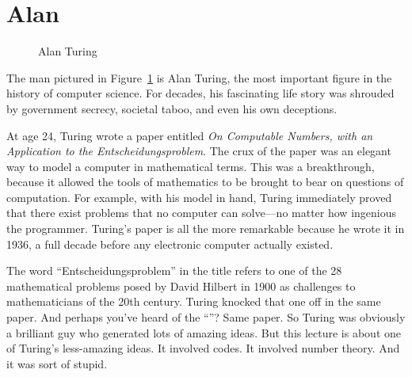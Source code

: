 \begin{problems}
\classproblems
{}

\homeworkproblems
{}

\end{problems}

\section{Alan }\label{Turing_sec}

\begin{figure}\redrawntrue
{}
\caption{Alan Turing}
\label{fig:Turing}
\end{figure}

The man pictured in Figure~\ref{fig:Turing} is Alan Turing, the most
important figure in the history of computer science.  For decades, his
fascinating life story was shrouded by government secrecy, societal
taboo, and even his own deceptions.

At age 24, Turing wrote a paper entitled \emph{On Computable Numbers,
with an Application to the Entscheidungsproblem}.  The crux of the
paper was an elegant way to model a computer in mathematical terms.
This was a breakthrough, because it allowed the tools of mathematics
to be brought to bear on questions of computation.  For example, with
his model in hand, Turing immediately proved that there exist problems
that no computer can solve---no matter how ingenious the programmer.
Turing's paper is all the more remarkable because he wrote it in 1936,
a full decade before any electronic computer actually existed.

The word ``Entscheidungsproblem'' in the title refers to one of the 28
mathematical problems posed by David Hilbert in 1900 as challenges to
mathematicians of the 20th century.  Turing knocked that one off in the
same paper.  And perhaps you've heard of the ``''?  Same paper.  So Turing was obviously a brilliant guy who
generated lots of amazing ideas.  But this lecture is about one of
Turing's less-amazing ideas.  It involved codes.  It involved number
theory.  And it was sort of stupid.


